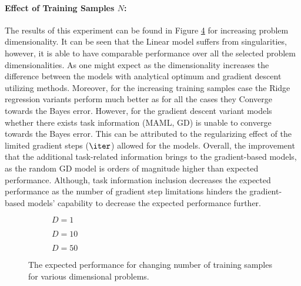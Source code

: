 \paragraph{Effect of Training Samples $N$:} The results of this experiment can be found in Figure \ref{fig:linear-N} for increasing problem dimensionality. It can be seen that the Linear model suffers from singularities, however, it is able to have comparable performance over all the selected problem dimensionalities. As one might expect as the dimensionality increases the difference between the models with analytical optimum and gradient descent utilizing methods. Moreover, for the increasing training samples case the Ridge regression variants perform much better as for all the cases they Converge towards the Bayes error. However, for the gradient descent variant models whether there exists task information (\eg MAML, GD) is unable to converge towards the Bayes error. This can be attributed to the regularizing effect of the limited gradient steps ($\iter$) allowed for the models. Overall, the improvement that the additional task-related information brings to the gradient-based models, as the random GD model is orders of magnitude higher than expected performance. Although, task information inclusion decreases the expected performance as the number of gradient step limitations hinders the gradient-based models' capability to decrease the expected performance further.

\begin{figure}[!h]
  \centering
    \begin{subfigure}{0.3\textwidth}
      \centering
      \caption{$D=1$}
      \label{fig:linear-N-D-1}
    \end{subfigure}
    \begin{subfigure}{0.3\textwidth}
      \centering
      \caption{$D=10$}
      \label{fig:linear-N-D-10}
    \end{subfigure}
    \begin{subfigure}{0.3\textwidth}
      \centering
      \caption{$D=50$}
      \label{fig:linear-N-D-50}
    \end{subfigure}
  \caption{The expected performance for changing number of training samples for various dimensional problems.}\label{fig:linear-N}
\end{figure}


